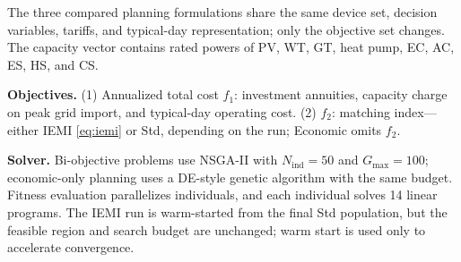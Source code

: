 The three compared planning formulations share the same device set, decision variables, tariffs, and typical-day representation; only the objective set changes. The capacity vector contains rated powers of PV, WT, GT, heat pump, EC, AC, ES, HS, and CS.

\textbf{Objectives.} (1) Annualized total cost $f_1$: investment annuities, capacity charge on peak grid import, and typical-day operating cost. (2) $f_2$: matching index---either IEMI \eqref{eq:iemi} or Std, depending on the run; Economic omits $f_2$.

\textbf{Solver.} Bi-objective problems use NSGA-II \cite{deb2002fast} with $N_{\text{ind}}=50$ and $G_{\text{max}}=100$; economic-only planning uses a DE-style genetic algorithm with the same budget. Fitness evaluation parallelizes individuals, and each individual solves 14 linear programs. The IEMI run is warm-started from the final Std population, but the feasible region and search budget are unchanged; warm start is used only to accelerate convergence.
